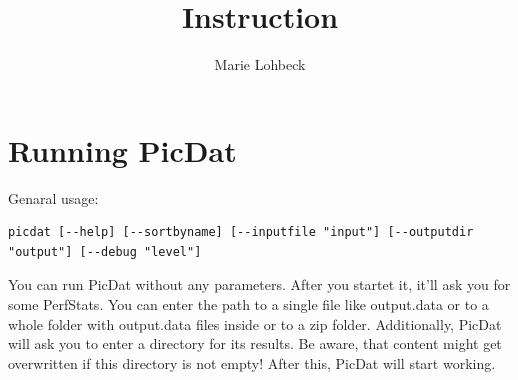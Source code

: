 \documentclass[8pt]{extarticle}
\title{Instruction}
\author{Marie Lohbeck}
\begin{document}
\section*{Running PicDat}
Genaral usage: 
\begin{lstlisting}
picdat [--help] [--sortbyname] [--inputfile "input"] [--outputdir "output"] [--debug "level"]
\end{lstlisting}

You can run PicDat without any parameters. After you startet it, it'll ask you for some PerfStats. You can enter the path to a single file like output.data or to a whole folder with output.data files inside or to a zip folder. Additionally, PicDat will ask you to enter a directory for its results. Be aware, that content might get overwritten if this directory is not empty! After this, PicDat will start working. 
\end{document}
